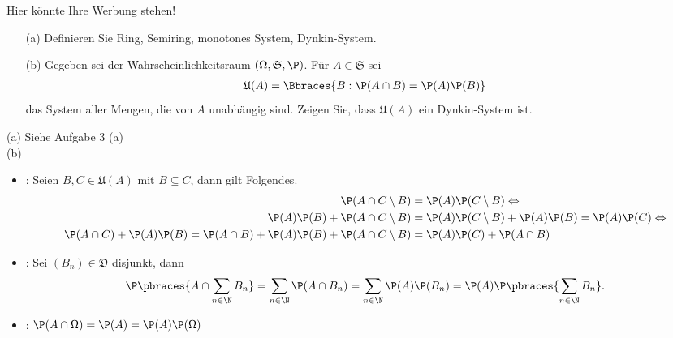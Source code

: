 \begin{exercise}

Hier könnte Ihre Werbung stehen!

\begin{itemize}
  \item[(a)] Definieren Sie Ring, Semiring, monotones System, Dynkin-System.
  \item[(b)] Gegeben sei der Wahrscheinlichkeitsraum $(\Omega, \mathfrak{S}, \P)$. Für $A \in \mathfrak{S}$ sei
  \begin{align*}
    \mathfrak{U}(A) = \Bbraces{B: \P(A \cap B) = \P(A) \P(B)}
  \end{align*}
  das System aller Mengen, die von $A$ unabhängig sind. Zeigen Sie, dass $\mathfrak{U}(A)$ ein Dynkin-System ist.
\end{itemize}

\end{exercise}

\begin{solution}

(a) Siehe Aufgabe 3 (a) \\

(b)

\begin{itemize}

  \item {}: Seien $B, C \in \mathfrak{U}(A)$ mit $B \subseteq C$, dann gilt Folgendes.
  \begin{align*}
    \P(A \cap C \setminus B)
    & = \P(A) \P(C \setminus B)
    \Leftrightarrow \\
    \P(A) \P(B) + \P(A \cap C \setminus B)
    & = \P(A) \P(C \setminus B) + \P(A) \P(B)
      = \P(A) \P(C)
    \Leftrightarrow \\
    \P(A \cap C) + \P(A) \P(B)
      =\P(A \cap B) + \P(A) \P(B) + \P(A \cap C \setminus B)
    & = \P(A) \P(C) + \P(A \cap B)
  \end{align*}

  \item {}: Sei $(B_n) \in \mathfrak{D}$ disjunkt, dann
  \begin{align*}
    \P \pbraces{A \cap \sum_{n \in \N} B_n}
    =
    \sum_{n \in \N} \P(A \cap B_n)
    =
    \sum_{n \in \N} \P(A) \P(B_n)
    =
    \P(A) \P \pbraces{\sum_{n \in \N} B_n}.
  \end{align*}

  \item {}: $\P(A \cap \Omega) = \P(A) = \P(A) \P(\Omega)$

\end{itemize}

\end{solution}

